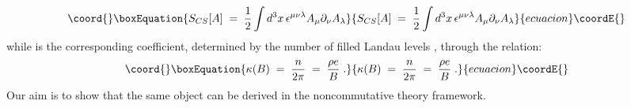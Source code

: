 \documentclass[a4paper,12pt]{article}
\begin{document}
\begin{equation}\coord{}\boxEquation{
  \label{eq:defscs}
S_{CS}[A]\;=\;\frac{1}{2}\int d^3x\,\epsilon^{\mu\nu\lambda} A_\mu\partial_\nu A_\lambda  
}{
  S_{CS}[A]\;=\;\frac{1}{2}\int d^3x\,\epsilon^{\mu\nu\lambda} A_\mu\partial_\nu A_\lambda  
}{ecuacion}\coordE{}\end{equation}
while \myHighlight{$\kappa$}\coordHE{} is the corresponding coefficient, determined by the number
of filled Landau levels \coordHE{}, through the relation:
\begin{equation}\coord{}\boxEquation{
  \label{eq:defk}
\kappa(B) \;=\;{\frac {n}{2\pi}}\;=\;{\frac { \rho e}{B}} \;.
}{
  \kappa(B) \;=\;{\frac {n}{2\pi}}\;=\;{\frac { \rho e}{B}} \;.
}{ecuacion}\coordE{}\end{equation}
Our aim is to show that the same object can be derived in the
noncommutative theory framework.
\end{document}
